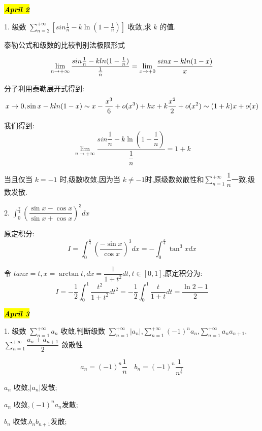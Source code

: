 \hl{\textbf{\textit{April 2}}}

1. 级数 $\sum\limits_{n=2}^{+\infty}[sin \frac{1}{n}-k\ln(1-\frac{1}{n})]$ 收敛,求 $k$ 的值.
\begin{solution}
	
	泰勒公式和级数的比较判别法极限形式
	
	$$\lim\limits_{n\rightarrow+\infty}\frac{sin \frac{1}{n}-k\\ln(1-\frac{1}{n})}{\frac{1}{n}}=\lim\limits_{x\rightarrow+0}\frac{sin x-k\\ln(1-x)}{x}$$
	
	分子利用泰勒展开式得到: 
	$$x\rightarrow 0,\sin x-k\\ln(1-x)\sim x-\frac{x^3}{6}+o(x^3)+kx+k\frac{x^2}{2}+o(x^2)\sim (1+k)x+o(x)$$
	
	我们得到: 
	$$\lim\limits_{n\rightarrow+\infty}\dfrac{sin \dfrac{1}{n}-k\ln(1-\dfrac{1}{n})}{\dfrac{1}{n}}=1+k$$
	
	当且仅当 $k=-1$ 时,级数收敛,因为当 $k\neq -1$时,原级数敛散性和$\sum\limits_{n=1}^{+\infty}\dfrac{1}{n}$一致,级数发散.
\end{solution}

2. $\int_{0}^{\frac{\pi}{4}}\left(\dfrac{\sin x-\cos x}{\sin x+\cos x} \right)^3dx $
\begin{solution}
	
	原定积分: 
	$$I=\int_{0}^{\frac{\pi}{4}}\left(\frac{-\sin x}{\cos x}\right)^3dx=-\int_{0}^{\frac{\pi}{4}}\tan^{3} xdx$$
	
	令 $tan x=t,x=\arctan t,dx=\dfrac{1}{1+t^2}dt,t\in[0,1]$,原定积分为: 
	$$I=-\frac{1}{2}\int_{0}^{1}\frac{t^2}{1+t^2}dt^2=-\frac{1}{2}\int_{0}^{1}\frac{t}{1+t}dt=\frac{\ln2-1}{2}$$
\end{solution}

\hl{\textbf{\textit{April 3}}}

1. 级数 $\sum\limits_{n=1}^{+\infty}a_{n}$ 收敛,判断级数 $\sum\limits_{n=1}^{+\infty}|a_{n}|$,$\sum\limits_{n=1}^{+\infty}(-1)^{n}a_{n}$,$\sum\limits_{n=1}^{+\infty}a_{n}a_{n+1}$,$\sum\limits_{n=1}^{+\infty}\dfrac{a_{n}+a_{n+1}}{2}$ 敛散性
\begin{solution}
	
	$$a_{n}=(-1)^n\frac{1}{n}\quad b_{n}=(-1)^n\frac{1}{n^{\frac{1}{2}}}$$
	
	$a_{n}$ 收敛,$|a_{n}|$发散;
	
	$a_{n}$ 收敛,$(-1)^na_{n}$发散;
	
	$b_{n}$ 收敛,$b_{n}b_{n+1}$发散;
\end{solution}

